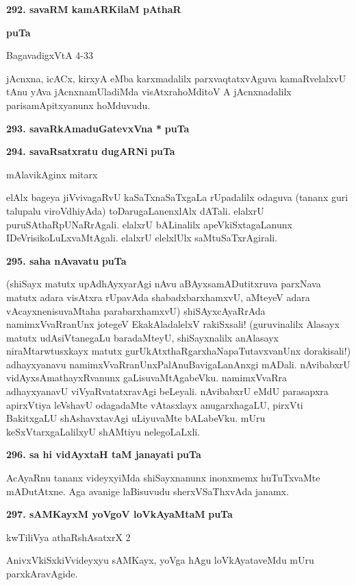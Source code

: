 \noindent
\textbf{292. savaRM kamARKilaM pAthaR} \hfill {\bf puTa \pageref{63}

\hfill BagavadigxVtA 4-33

\smallskip
jAcnxna, icACx, kirxyA eMba karxmadalilx parxvaqtatxvAguva kamaRvelalxvU tAnu yAva jAcnxnamUladiMda visAtxrahoMditoV A jAcnxnadalilx parisamApitxyanunx hoMduvudu.

\medskip
\noindent
\textbf{293. savaRkAmaduGatevxVna *} \hfill {\bf puTa \pageref{95}}

\smallskip
\noindent
\textbf{294. savaRsatxratu dugARNi} \hfill {\bf puTa \pageref{244}}

\hfill mAlavikAginx mitarx

\smallskip
elAlx bageya jiVvivagaRvU kaSaTxnaSaTxgaLa rUpadalilx odaguva (tananx guri talu\-palu viroVdhi\-yAda) toDarugaLanenxlAlx dATali. elalxrU puruSAthaRpUNaR\-rAgali.  elalxrU bALinalilx apeVkiSxtagaLanunx IDeV\-risi\-koLuLxvaMtAgali. elalxrU elelxlUlx saMtuSaTxrAgirali.

\medskip
\noindent
\textbf{295. saha nAvavatu} \hfill {\bf puTa \pageref{46}}

\smallskip
(shiSayx matutx upAdhAyxyarAgi nAvu aBAyxsamADutitxruva parxNava matutx adara visAtxra rUpa\-vAda shabadxbarxhamxvU, aMteyeV adara vAcayxnenisuvaMtaha para\-barxhamxvU) shiSAyxcAyaRrAda namimxVvaR\-ranUnx jotegeV EkakAladalelxV rakiSxsali! (guruvinalilx Alasayx matutx udAsiVtanegaLu baradaMteyU, shiSayx\-nalilx anAlasayx niraMtarwtusxkayx matutx gurUkAtxthaRgarxhaNapaTutavxvanUnx dorakisali!) adhayx\-yanavu namimxVvaRranUnx\break PalAnuBavigaLanAnxgi mADali. nAvibabxrU vidAyxsAmathayxRvanunx gaLisuvaMtAga\-beVku. namimxV\-vaRra adhayxyanavU viVyaRvatatxravAgi beLeyali. nAvibabxrU eMdU parasapxra apirxVtiya leVshavU odaga\-daMte vAtasxlayx anugarxhagaLU, pirxVti BakitxgaLU shAshavxtavAgi uLiyuvaMte bALabeVku. mUru keSxVtarx\-gaLa\-lilxyU shAMtiyu nele\-goLaLxli.
 
\noindent
\textbf{296. sa hi vidAyxtaH taM janayati} \hfill {\bf puTa \pageref{91}}

\smallskip
AcAyaRnu tananx videyxyiMda shiSayxnanunx inonxmemx huTuTxvaMte mADutAtxne. Aga avanige laBisu\-vudu sherxVSaThxvAda janamx.

\medskip
\textbf{297. sAMKayxM yoVgoV loVkAyaMtaM} \hfill {\bf puTa \pageref{98}}

\hfill kwTiliVya athaRshAsatxrX 2

\smallskip
AnivxVkiSxkiVvideyxyu sAMKayx, yoVga hAgu loVkAyataveMdu mUru parxkAravAgide.

}
